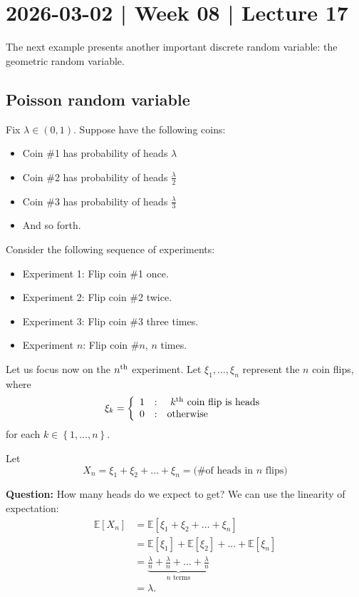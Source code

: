 \documentclass[10pt]{article}
\theoremstyle{definition}
\newcommand{\vt}{\vskip 5mm} %
\newcommand{\Fl}{\vt\noindent\textbf} %
\newcommand{\1}[1]{\textbf{1}_{\left[#1\right]}} %
\def\E{\mathbb{E}} %
\begin{document}
\newpage

\section{2026-03-02 | Week 08 | Lecture 17}
The next example presents another important discrete random variable: the
geometric random variable.

\subsection{Poisson random variable}
Fix $\lambda\in (0,1)$. Suppose have the following coins:
\begin{itemize}
  \item Coin \#1 has probability of heads $\lambda$
  \item Coin \#2 has probability of heads $\frac{\lambda}{2}$
  \item Coin \#3 has probability of heads $\frac{\lambda}{3}$
  \item And so forth.
\end{itemize}
Consider the following sequence of experiments:
\begin{itemize}
  \item Experiment 1: Flip coin \#1 once. 
  \item Experiment 2: Flip coin \#2 twice.
  \item Experiment 3: Flip coin \#3 three times.
  \item Experiment $n$: Flip coin $\#n$, $n$ times. 
\end{itemize}

Let us focus now on the $n^{\rm th}$ experiment. Let $\xi_{1},\ldots,\xi_{n}$ represent the $n$ coin flips, where
\begin{equation*}
  \xi_{k} = \left\{ \begin{array}{l@{\quad:\quad}l} 1 & \text{ $k^{\rm th}$ coin flip is heads} \\ 0 & \text{otherwise}\end{array}\right.
\end{equation*}
for each $k\in \left\{1,\ldots,n\right\}$.

Let
\begin{equation*}
  X_{n} = \xi_{1}+\xi_{2}+\ldots+\xi_{n} = \text{(\# of heads in $n$ flips)}
\end{equation*}

\Fl{Question:} How many heads do we expect to get? We can use the linearity of
expectation:
\begin{align*} 
  \E\left[X_{n} \right] 
  &= \E\left[ \xi_{1}+\xi_{2}+\ldots+\xi_{n} \right] \\
  &= \E\left[\xi_{1} \right]+ \E\left[\xi_{2} \right]+\ldots+ \E\left[\xi_{n} \right]\\
  &= \underbrace{\frac{\lambda}{n}+ \frac{\lambda}{n} + \ldots+\frac{\lambda}{n}}_{n\text{ terms}}\\
  &=\lambda.
\end{align*}
\end{document}
